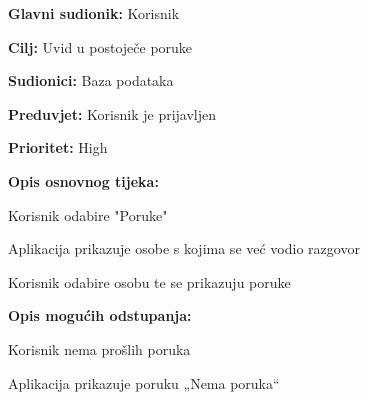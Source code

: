 \noindent {}
	\begin{packed_item}

		\item \textbf{Glavni sudionik: }Korisnik
		\item \textbf{Cilj:} Uvid u postoječe poruke
		\item \textbf{Sudionici:} Baza podataka
		\item \textbf{Preduvjet:} Korisnik je prijavljen
		\item \textbf{Prioritet:} High
		\item \textbf{Opis osnovnog tijeka:}
		
		\item[] \begin{packed_enum}

			\item Korisnik odabire "Poruke"
			\item Aplikacija prikazuje osobe s kojima se već vodio razgovor
			\item Korisnik odabire osobu te se prikazuju poruke
		\end{packed_enum}
	
		\item  \textbf{Opis mogućih odstupanja:}
	
		\item[] \begin{packed_item}

			\item[2.a] Korisnik nema prošlih poruka
			\item[] \begin{packed_enum}
				\item Aplikacija prikazuje poruku „Nema poruka“
			\end{packed_enum}
		\end{packed_item}
	\end{packed_item}

